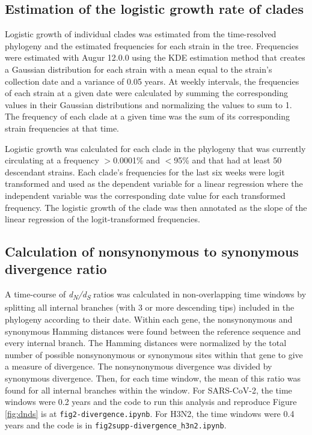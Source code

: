 \documentclass[11pt,oneside,letterpaper]{article}
\begin{document}
\subsection*{Estimation of the logistic growth rate of clades}
Logistic growth of individual clades was estimated from the time-resolved phylogeny and the estimated frequencies for each strain in the tree.
Frequencies were estimated with Augur 12.0.0 \cite{Huddleston2021-uh} using the KDE estimation method that creates a Gaussian distribution for each strain with a mean equal to the strain's collection date and a variance of 0.05 years.
At weekly intervals, the frequencies of each strain at a given date were calculated by summing the corresponding values in their Gaussian distributions and normalizing the values to sum to 1.
The frequency of each clade at a given time was the sum of its corresponding strain frequencies at that time.

Logistic growth was calculated for each clade in the phylogeny that was currently circulating at a frequency $>$0.0001\% and $<$95\% and that had at least 50 descendant strains.
Each clade's frequencies for the last six weeks were logit transformed and used as the dependent variable for a linear regression where the independent variable was the corresponding date value for each transformed frequency.
The logistic growth of the clade was then annotated as the slope of the linear regression of the logit-transformed frequencies.

\subsection*{Calculation of nonsynonymous to synonymous divergence ratio}
A time-course of \emph{d\textsubscript{N}/d\textsubscript{S}} ratios was calculated in non-overlapping time windows by splitting all internal branches (with 3 or more descending tips) included in the phylogeny according to their date.
Within each gene, the nonsynonymous and synonymous Hamming distances were found between the reference sequence and every internal branch.
The Hamming distances were normalized by the total number of possible nonsynonymous or synonymous sites within that gene to give a measure of divergence.
The nonsynonymous divergence was divided by synonymous divergence. Then, for each time window, the mean of this ratio was found for all internal branches within the window.
For SARS-CoV-2, the time windows were 0.2 years and the code to run this analysis and reproduce Figure \ref{fig:dnds} is at \texttt{fig2-divergence.ipynb}.
For H3N2, the time windows were 0.4 years and the code is in \texttt{fig2supp-divergence\_h3n2.ipynb}.
\end{document}
